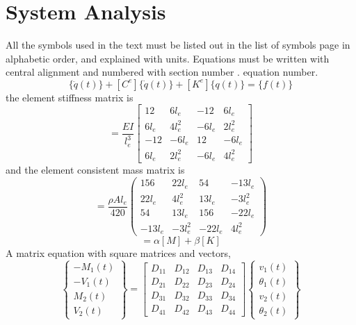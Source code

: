 \documentclass[BTech]{srmuthesis}
\begin{document}
\chapter{System Analysis}
All the symbols used in the text must be listed out in the list of symbols page in alphabetic order, and explained with units. Equations must be written with central alignment and numbered with section number . equation number. 
\begin{equation}
[M^e]\{\ddot{q}(t)\}+[C^e]\{\dot{q}(t)\}+[K^e]\{q(t)\}=\{f(t)\}
\label{eq:mkceqn}
\end{equation}  
the element stiffness matrix is
\begin{equation}
[K^e]=\frac{EI}{l_e^3}\begin{bmatrix}
12&6l_e &-12&6l_e\\
6l_e&4l_e^2&-6l_e&2l_e^2\\
-12&-6l_e&12&-6l_e\\
6l_e&2l_e^2&-6l_e&4l_e^2
\end{bmatrix}
\label{eq:sm}
\end{equation}
and the element consistent mass matrix is
\begin{equation}
[M^e]=\frac{\rho Al_e}{420}\begin{pmatrix}
156&22l_e &54&-13l_e\\
22l_e&4l_e^2&13l_e&-3l_e^2\\
54&13l_e&156&-22l_e\\
-13l_e&-3l_e^2&-22l_e&4l_e^2
\end{pmatrix}
\label{eq:cmm}
\end{equation}
\begin{equation}
[C]=\alpha[M]+\beta[K]
\end{equation}
A matrix equation with square matrices and vectors,
\begin{equation}
\begin{Bmatrix}
-M_1(t)\\
-V_1(t)\\
M_2(t)\\
V_2(t)\end{Bmatrix}=\begin{bmatrix}
D_{11}&D_{12}&D_{13}&D_{14}\\
D_{21}&D_{22}&D_{23}&D_{24}\\
D_{31}&D_{32}&D_{33}&D_{34}\\
D_{41}&D_{42}&D_{43}&D_{44}\end{bmatrix}\begin{Bmatrix}
v_1(t)\\
\theta_1(t)\\
v_2(t)\\
\theta_2(t)\end{Bmatrix}
\label{eq:D}
\end{equation}
\end{document}
